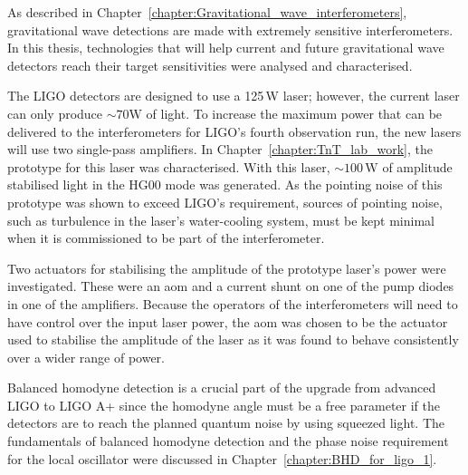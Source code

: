 As described in Chapter~\ref{chapter:Gravitational_wave_interferometers}, gravitational wave detections are made with extremely sensitive interferometers. In this thesis, technologies that will help current and future gravitational wave detectors reach their target sensitivities were analysed and characterised.  
\par
The LIGO detectors are designed to use a 125\,W laser; however, the current laser can only produce $\sim70\si{\watt}$ of light. To increase the maximum power that can be delivered to the interferometers for LIGO's fourth observation run, the new lasers will use two single-pass amplifiers. In Chapter~\ref{chapter:TnT_lab_work}, the prototype for this laser was characterised. With this laser, $\sim100\,\si{\watt}$ of amplitude stabilised light in the HG00 mode was generated. As the pointing noise of this prototype was shown to exceed LIGO's requirement, sources of pointing noise, such as turbulence in the laser's water-cooling system, must be kept minimal when it is commissioned to be part of the interferometer.
\par
Two actuators for stabilising the amplitude of the prototype laser's power were investigated. These were an \gls{aom} and a current shunt on one of the pump diodes in one of the amplifiers. Because the operators of the interferometers will need to have control over the input laser power, the \gls{aom} was chosen to be the actuator used to stabilise the amplitude of the laser as it was found to behave consistently over a wider range of power. 
\par
Balanced homodyne detection is a crucial part of the upgrade from advanced LIGO to LIGO A+ since the homodyne angle must be a free parameter if the detectors are to reach the planned quantum noise by using squeezed light. The fundamentals of balanced homodyne detection and the phase noise requirement for the local oscillator were discussed in Chapter~\ref{chapter:BHD_for_ligo_1}. 
